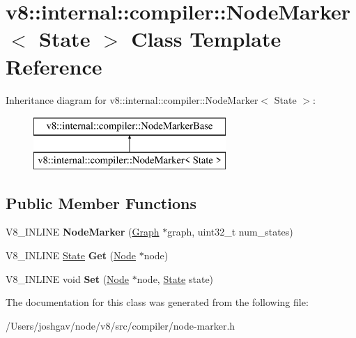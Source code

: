 \hypertarget{classv8_1_1internal_1_1compiler_1_1_node_marker}{}\section{v8\+:\+:internal\+:\+:compiler\+:\+:Node\+Marker$<$ State $>$ Class Template Reference}
\label{classv8_1_1internal_1_1compiler_1_1_node_marker}
Inheritance diagram for v8\+:\+:internal\+:\+:compiler\+:\+:Node\+Marker$<$ State $>$\+:\begin{figure}[H]
\begin{center}
\leavevmode
\includegraphics[height=2.000000cm]{classv8_1_1internal_1_1compiler_1_1_node_marker}
\end{center}
\end{figure}
\subsection*{Public Member Functions}
\begin{DoxyCompactItemize}
\item 
V8\+\_\+\+I\+N\+L\+I\+NE {\bfseries Node\+Marker} (\hyperlink{classv8_1_1internal_1_1compiler_1_1_graph}{Graph} $\ast$graph, uint32\+\_\+t num\+\_\+states)\hypertarget{classv8_1_1internal_1_1compiler_1_1_node_marker_afa83d6803e39a8a701ceeea579773e48}{}\label{classv8_1_1internal_1_1compiler_1_1_node_marker_afa83d6803e39a8a701ceeea579773e48}

\item 
V8\+\_\+\+I\+N\+L\+I\+NE \hyperlink{classv8_1_1internal_1_1_state}{State} {\bfseries Get} (\hyperlink{classv8_1_1internal_1_1compiler_1_1_node}{Node} $\ast$node)\hypertarget{classv8_1_1internal_1_1compiler_1_1_node_marker_a03333aee531a9e8bef1573ba75e0e1a8}{}\label{classv8_1_1internal_1_1compiler_1_1_node_marker_a03333aee531a9e8bef1573ba75e0e1a8}

\item 
V8\+\_\+\+I\+N\+L\+I\+NE void {\bfseries Set} (\hyperlink{classv8_1_1internal_1_1compiler_1_1_node}{Node} $\ast$node, \hyperlink{classv8_1_1internal_1_1_state}{State} state)\hypertarget{classv8_1_1internal_1_1compiler_1_1_node_marker_a6a44f8d846c668f25e36433d4eb00335}{}\label{classv8_1_1internal_1_1compiler_1_1_node_marker_a6a44f8d846c668f25e36433d4eb00335}

\end{DoxyCompactItemize}


The documentation for this class was generated from the following file\+:\begin{DoxyCompactItemize}
\item 
/\+Users/joshgav/node/v8/src/compiler/node-\/marker.\+h\end{DoxyCompactItemize}

